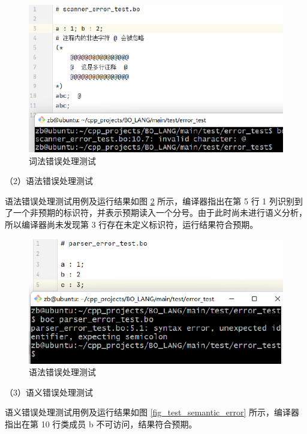 \begin{figure}[H]
    \centering\includegraphics[width=13cm]{figure/test_scanner_error.pdf}
    \caption{词法错误处理测试}
    \label{fig_test_scanner_error}
\end{figure}

（2）语法错误处理测试

语法错误处理测试用例及运行结果如图 \ref{fig_test_parser_error} 所示，编译器指出在第 5 行 1 列识别到了一个非预期的标识符，并表示预期读入一个分号。由于此时尚未进行语义分析，所以编译器尚未发现第 3 行存在未定义标识符，运行结果符合预期。

\begin{figure}[H]
    \centering\includegraphics[width=13cm]{figure/test_parser_error.pdf}
    \caption{语法错误处理测试}
    \label{fig_test_parser_error}
\end{figure}

（3）语义错误处理测试

语义错误处理测试用例及运行结果如图 \ref{fig_test_semantic_error} 所示，编译器指出在第 10 行类成员 b 不可访问，结果符合预期。


